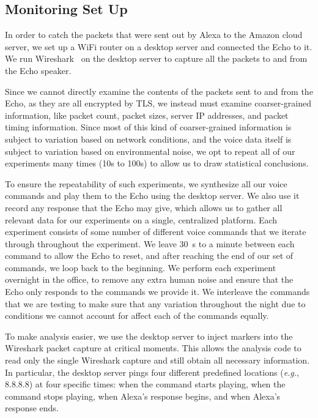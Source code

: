 \subsection{Monitoring Set Up}
\label{sec:expr:set-up}

In order to catch the packets that were sent out by Alexa to the Amazon cloud server, we set up a WiFi router on a desktop server and connected the Echo to it. We run Wireshark~\cite{wireshark} on the desktop server to capture all the packets to and from the Echo speaker.

Since we cannot directly examine the contents of the packets sent to and from the Echo, as they are all encrypted by TLS, we instead must examine coarser-grained information, like packet count, packet sizes, server IP addresses, and packet timing information. Since most of this kind of coarser-grained information is subject to variation based on network conditions, and the voice data itself is subject to variation based on environmental noise, we opt to repeat all of our experiments many times (10s to 100s) to allow us to draw statistical conclusions. 

To ensure the repeatability of such experiments, we synthesize all our voice commands and play them to the Echo using the desktop server. We also use it record any response that the Echo may give, which allows us to gather all relevant data for our experiments on a single, centralized platform. Each experiment consists of some number of different voice commands that we iterate through throughout the experiment. We leave 30~s to a minute between each command to allow the Echo to reset, and after reaching the end of our set of commands, we loop back to the beginning. We perform each experiment overnight in the office, to remove any extra human noise and ensure that the Echo only responds to the commands we provide it. We interleave the commands that we are testing to make sure that any variation throughout the night due to conditions we cannot account for affect each of the commands equally.

To make analysis easier, we use the desktop server to inject markers into the Wireshark packet capture at critical moments. This allows the analysis code to read only the single Wireshark capture and still obtain all necessary information. In particular, the desktop server pings four different predefined locations (\textit{e.g.}, 8.8.8.8) at four specific times: when the command starts playing, when the command stops playing, when Alexa's response begins, and when Alexa's response ends.

